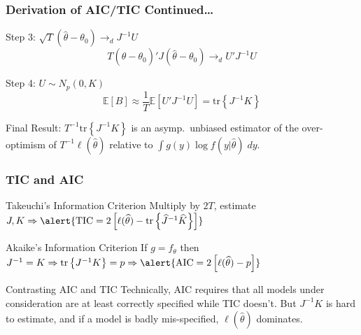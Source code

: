 \begin{frame}
  \frametitle{Derivation of AIC/TIC Continued\dots}
  \begin{block}{Step 3: $\sqrt{T}(\widehat{\theta} - \theta_0) \rightarrow_d J^{-1}U$}
    \vspace{-1.5em}
    \[
      T(\widehat{\theta} - \theta_0)'J(\widehat{\theta} - \theta_0) \rightarrow_d U'J^{-1}U
    \]
  \end{block}

  \pause
  
  \begin{block}{Step 4: $U \sim N_p(0, K)$}
    \vspace{-1.5em}
   \[
     \mathbb{E}[B] \approx \frac{1}{T} \mathbb{E}[U'J^{-1}U] = \text{tr}\left\{ J^{-1}K \right\}
   \]
  \end{block}

  \pause

  \vspace{-1em}

  \begin{block}{Final Result:}
    $T^{-1}\text{tr}\left\{ J^{-1}K \right\}$ is an asymp.\ unbiased estimator of the over-optimism of $T^{-1}\ell(\widehat{\theta})$ relative to $\int g(y)\log f(y|\widehat{\theta})\; dy$.
  \end{block}

\end{frame}
\begin{frame}
  \frametitle{TIC and AIC}
  \begin{block}{Takeuchi's Information Criterion}
    Multiply by $2T$, estimate $J,K \Rightarrow \alert{\text{TIC} = 2\left[ \ell(\widehat{\theta}) - \text{tr}\left\{ \widehat{J}^{-1}\widehat{K} \right\} \right]}$
  \end{block}

  \pause

  \begin{block}{Akaike's Information Criterion}
    If $g = f_\theta$ then $J^{-1} = K \Rightarrow \text{tr}\left\{ J^{-1  }K \right\} = p \Rightarrow \alert{\text{AIC} = 2\left[ \ell(\widehat{\theta}) - p \right]}$ 
  \end{block}

  \pause

  \begin{block}{Contrasting AIC and TIC} 
    Technically, AIC requires that all models under consideration are at least correctly specified while TIC doesn't. 
    But $J^{-1}K$ is hard to estimate, and if a model is badly mis-specified, $\ell(\widehat{\theta})$ dominates.
  \end{block}

\end{frame}
